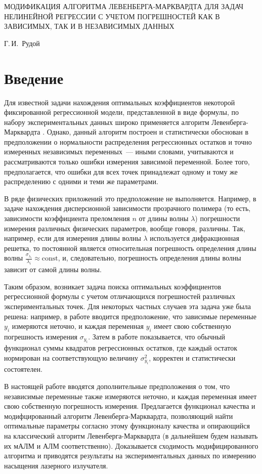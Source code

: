 \documentclass[11pt,a4paper]{article}
\begin{document}
\begin{center}
  МОДИФИКАЦИЯ АЛГОРИТМА ЛЕВЕНБЕРГА-МАРКВАРДТА ДЛЯ ЗАДАЧ НЕЛИНЕЙНОЙ РЕГРЕССИИ С УЧЕТОМ
  ПОГРЕШНОСТЕЙ КАК В ЗАВИСИМЫХ, ТАК И В НЕЗАВИСИМЫХ ДАННЫХ

  \bigskip
  Г.\,И.~Рудой
\end{center}

\section{Введение}

Для известной задачи нахождения оптимальных коэффициентов некоторой фиксированной
регрессионной модели, представленной в виде формулы, по набору экспериментальных
данных широко применяется алгоритм
Левенберга-Марквардта \cite{Marquardt1963Algorithm}. Однако, данный алгоритм построен
и статистически обоснован в предположении о нормальности распределения регрессионных
остатков и точно измеренных независимых переменных~--- иными словами, учитываются
и рассматриваются только ошибки измерения зависимой переменной. Более того,
предполагается, что ошибки для всех точек принадлежат одному и тому же распределению
с одними и теми же параметрами.

В ряде физических приложений это предположение не выполняется. Например, в задаче
нахождения дисперсионной зависимости прозрачного полимера (то есть, зависимости
коэффициента преломления $n$ от длины волны $\lambda$) погрешности измерения
различных физических параметров, вообще говоря, различны. Так, например, если
для измерения длины волны $\lambda$ используется дифракционная решетка, то постоянной
является относительная погрешность определения длины волны
$\frac{\sigma_{\lambda_i}}{\lambda_i} \approx \text{const}$, и, следовательно,
погрешность определения длины волны зависит от самой длины волны.

Таким образом, возникает задача поиска оптимальных коэффициентов регрессионной
формулы с учетом отличающихся погрешностей различных экспериментальных точек.
Для некоторых частных случаев эта задача уже была решена: например, 
в работе \cite{...} вводится предположение, что зависимые переменные $y_i$ измеряются
неточно, и каждая переменная $y_i$ имеет свою собственную погрешность измерения
$\sigma_{y_i}$. Затем в работе показывается, что обычный функционал суммы квадратов
регрессионных остатков, где каждый остаток нормирован на соответствующую величину
$\sigma_{y_i}^2$, корректен и статистически состоятелен.

В настоящей работе вводятся дополнительные предположения о том, что независимые
переменные также измеряются неточно, и каждая переменная имеет свою собственную
погрешность измерения. Предлагается функционал качества и модифцированный алгоритм
Левенберга-Марквардта, позволяющий найти оптимальные параметры согласно этому
функционалу качества и опирающийся на классический алгоритм
Левенберга-Марквардта (в дальнейшем будем называть их мАЛМ и АЛМ соответственно).
Доказывается сходимость модифицированного алгоритма и приводятся
результаты на экспериментальных данных по измерению насыщения лазерного излучателя.
\end{document}
